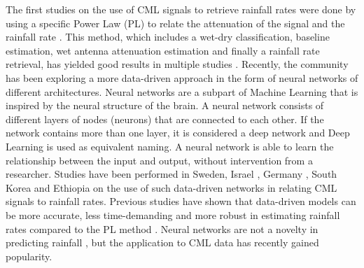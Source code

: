 \documentclass[twocolumn, 10pt, a4paper]{article}
\begin{document}
	The first studies on the use of CML signals to retrieve rainfall rates were done by using a specific Power Law (PL) to relate the attenuation of the signal and the rainfall rate \cite{Overeem2011,Leijnse2007}. This method, which includes a wet-dry classification, baseline estimation, wet antenna attenuation estimation and finally a rainfall rate retrieval, has yielded good results in multiple studies \cite{deVos2019,Graf2020,Fencl2017}. Recently, the community has been exploring a more data-driven approach in the form of neural networks of different architectures. Neural networks are a subpart of Machine Learning that is inspired by the neural structure of the brain. A neural network consists of different layers of nodes (neurons) that are connected to each other. If the network contains more than one layer, it is considered a deep network and Deep Learning is used as equivalent naming. A neural network is able to learn the relationship between the input and output, without intervention from a researcher. Studies have been performed in Sweden, Israel \cite{Habi2019}, Germany \cite{Polz2020}, South Korea and Ethiopia \cite{Diba2021} on the use of such data-driven networks in relating CML signals to rainfall rates. Previous studies have shown that data-driven models can be more accurate, less time-demanding and more robust in estimating rainfall rates compared to the PL method \cite{Polz2020,Pudashine2020}. Neural networks are not a novelty in predicting rainfall \cite{French1992}, but the application to CML data has recently gained popularity.
		
\end{document}
